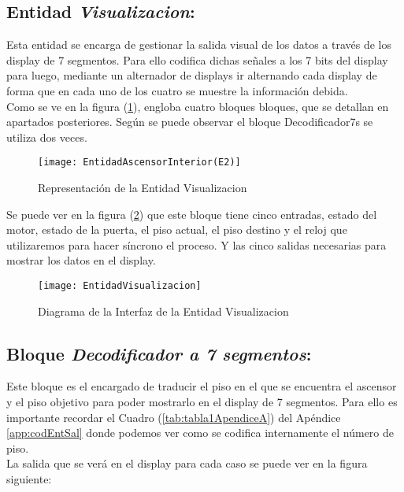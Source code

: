 \subsection{Entidad \textit{Visualizacion}:} \label{bloque:Visualizacion}	
	Esta entidad se encarga de gestionar la salida visual de los datos a través de los display de 7 segmentos. Para ello codifica dichas señales a los 7 bits del display para luego, mediante un alternador de displays ir alternando cada display de forma que en cada uno de los cuatro se muestre la información debida.  \\ 

	Como se ve en la figura (\ref{fig:EntidadesAscensorE2}), engloba cuatro bloques bloques, que se detallan en apartados posteriores. Según se puede observar el bloque Decodificador7s se utiliza dos veces.
	\begin{figure}[H]
		    \centering
		    \texttt{[image: EntidadAscensorInterior(E2)]}
		    \caption{Representación de la Entidad Visualizacion}
		    \label{fig:EntidadesAscensorE2}
	\end{figure}

	Se puede ver en la figura (\ref{fig:EntidadVisualizacion}) que este bloque tiene cinco entradas, estado del motor, estado de la puerta, el piso actual, el piso destino y el reloj que utilizaremos para hacer síncrono el proceso. Y las cinco salidas necesarias para mostrar los datos en el display.
    \begin{figure}[H]
		    \centering
		    \texttt{[image: EntidadVisualizacion]}
		    \caption{Diagrama de la Interfaz de la Entidad Visualizacion}
		    \label{fig:EntidadVisualizacion}
	\end{figure} 


\subsection{Bloque \textit{Decodificador a 7 segmentos}:} \label{bloque:Decodificador7s}
    Este bloque es el encargado de traducir el piso en el que se encuentra el ascensor y el piso objetivo para poder mostrarlo en el display de 7 segmentos. Para ello es importante recordar el Cuadro (\ref{tab:tabla1ApendiceA}) del Apéndice \ref{app:codEntSal} donde podemos ver como se codifica internamente el número de piso. \\ 
    
    La salida que se verá en el display para cada caso se puede ver en la figura siguiente:
    

